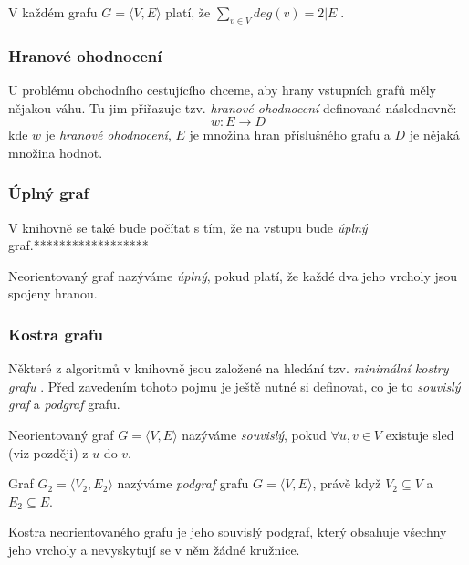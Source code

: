 \documentclass[
  biblatex,
  figures=false,
  glossaries,
  index
]{kidiplom}
\begin{document}
\begin{theorem}
V každém grafu $G=\langle V, E \rangle$ platí, že $\sum_{v \in V} deg(v) = 2 |E|$.
\end{theorem}

\subsubsection{Hranové ohodnocení}
U problému obchodního cestujícího chceme, aby hrany vstupních grafů měly nějakou váhu. Tu jim přiřazuje tzv. \textit{hranové ohodnocení} definované následnovně:
$$w : E \rightarrow D$$
kde $w$ je \textit{hranové ohodnocení}, $E$ je množina hran příslušného grafu a $D$ je nějaká množina hodnot.

\subsubsection{Úplný graf}
V knihovně se také bude počítat s tím, že na vstupu bude \textit{úplný} graf.******************
\begin{definition}
Neorientovaný graf nazýváme \textit{úplný}, pokud platí, že každé dva jeho vrcholy jsou spojeny hranou.
\end{definition}

\subsubsection{Kostra grafu}
Některé z algoritmů v knihovně jsou založené na hledání tzv. \textit{minimální kostry grafu} . Před zavedením tohoto pojmu je ještě nutné si definovat, co je to \textit{souvislý graf} a \textit{podgraf} grafu.

\begin{definition}
Neorientovaný graf $G=\langle V, E \rangle$ nazýváme \textit{souvislý}, pokud $\forall u,v \in V$ existuje sled (viz později) z $u$ do $v$.
\end{definition}

\begin{definition}[Podgraf]
Graf $G_2=\langle V_2, E_2 \rangle$ nazýváme \textit{podgraf} grafu $G=\langle V, E \rangle$, právě když $V_2 \subseteq V$ a $E_2 \subseteq  E$.
\end{definition}

\begin{definition}
Kostra neorientovaného grafu je jeho souvislý podgraf, který obsahuje všechny jeho vrcholy a nevyskytují se v něm žádné kružnice.
\end{definition}
\end{document}
